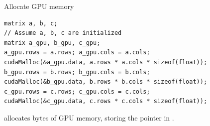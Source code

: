 \begin{frame}[fragile]{Allocate GPU memory}
    \begin{verbatim}
matrix a, b, c;
// Assume a, b, c are initialized
matrix a_gpu, b_gpu, c_gpu;
a_gpu.rows = a.rows; a_gpu.cols = a.cols;
cudaMalloc(&a_gpu.data, a.rows * a.cols * sizeof(float));
b_gpu.rows = b.rows; b_gpu.cols = b.cols;
cudaMalloc(&b_gpu.data, b.rows * b.cols * sizeof(float));
c_gpu.rows = c.rows; c_gpu.cols = c.cols;
cudaMalloc(&c_gpu.data, c.rows * c.cols * sizeof(float));
    \end{verbatim}

     allocates  bytes of GPU memory, storing the pointer in .

\end{frame}

